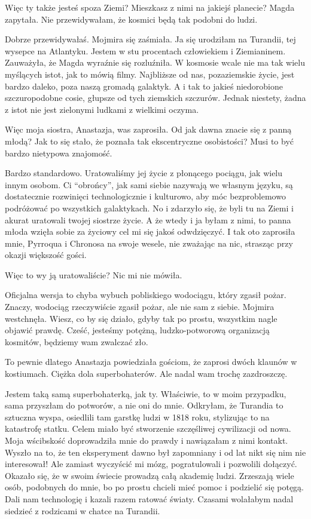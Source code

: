 \ds{} Więc ty także jesteś spoza Ziemi? Mieszkasz z nimi na jakiejś planecie? \dm{} Magda zapytała. \dm{} Nie przewidywałam, że kosmici będą tak podobni do ludzi. \de{}

\ds{} Dobrze przewidywałaś. \dm{} Mojmira się zaśmiała. \dm{} Ja się urodziłam na Turandii, tej wysepce na Atlantyku. Jestem w stu procentach człowiekiem i Ziemianinem.
\dm{} Zauważyła, że Magda wyraźnie się rozluźniła. \dm{} W kosmosie wcale nie ma tak wielu myślących istot, jak to mówią filmy. 
Najbliższe od nas, pozaziemskie życie, jest bardzo daleko, poza naszą gromadą galaktyk. A i tak to jakieś niedorobione szczuropodobne cosie, głupsze od tych ziemskich szczurów.
Jednak niestety, żadna z istot nie jest zielonymi ludkami z wielkimi oczyma.
\de{}

\ds{} Więc moja siostra, Anastazja, was zaprosiła. Od jak dawna znacie się z panną młodą? Jak to się stało, że poznała tak ekscentryczne osobistości? Musi to być bardzo nietypowa znajomość. \de{} 

\ds{} Bardzo standardowo. Uratowaliśmy jej życie z płonącego pociągu, jak wielu innym osobom. 
Ci "`obrońcy"', jak sami siebie nazywają we własnym języku, są dostatecznie rozwinięci technologicznie i kulturowo, aby móc bezproblemowo podróżować po wszystkich galaktykach.
No i zdarzyło się, że byli tu na Ziemi i akurat uratowali twojej siostrze życie.
A że wtedy i ja byłam z nimi, to panna młoda wzięła sobie za życiowy cel mi się jakoś odwdzięczyć. 
I tak oto zaprosiła mnie, Pyrroqua i Chronosa na swoje wesele, nie zważając na nic, strasząc przy okazji większość gości.\de{}

\ds{} Więc to wy ją uratowaliście? Nic mi nie mówiła. \de{}

\ds{} Oficjalna wersja to chyba wybuch pobliskiego wodociągu, który zgasił pożar. 
Znaczy, wodociąg rzeczywiście zgasił pożar, ale nie sam z siebie.
\dm{} Mojmira westchnęła. \dm{}
Wiesz, co by się działo, gdyby tak po prostu, wszystkim nagle objawić prawdę.
Cześć, jesteśmy potężną, ludzko-potworową organizacją kosmitów, będziemy wam zwalczać zło.

\ds{} To pewnie dlatego Anastazja powiedziała gościom, że zaprosi dwóch klaunów w kostiumach. Ciężka dola superbohaterów. Ale nadal wam trochę zazdroszczę.\de{}

\ds{} Jestem taką samą superbohaterką, jak ty. Właściwie, to w moim przypadku, sama przyszłam do potworów, a nie oni do mnie.
Odkryłam, że Turandia to sztuczna wyspa, osiedlili tam garstkę ludzi w 1818 roku, stylizując to na katastrofę statku.
Celem miało być stworzenie szczęśliwej cywilizacji od nowa. Moja wścibskość doprowadziła mnie do prawdy i nawiązałam z nimi kontakt.
Wyszło na to, że ten eksperyment dawno był zapomniany i od lat nikt się nim nie interesował!
Ale zamiast wyczyścić mi mózg, pogratulowali i pozwolili dołączyć. 
Okazało się, że w swoim świecie prowadzą całą akademię ludzi. Zrzeszają wiele osób, podobnych do mnie, bo po prostu chcieli mieć pomoc i podzielić się potęgą.
Dali nam technologię i kazali razem ratować światy. Czasami wolałabym nadal siedzieć z rodzicami w chatce na Turandii.


